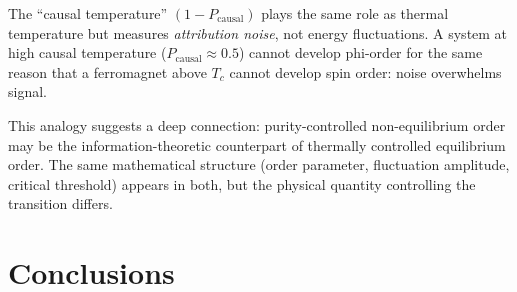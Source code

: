 \documentclass[11pt,a4paper]{article}
\begin{document}
The ``causal temperature'' $(1-P_\mathrm{causal})$ plays the same role as thermal
temperature but measures \emph{attribution noise}, not energy fluctuations.
A system at high causal temperature ($P_\mathrm{causal} \approx 0.5$) cannot
develop phi-order for the same reason that a ferromagnet above $T_c$ cannot
develop spin order: noise overwhelms signal.

This analogy suggests a deep connection:
purity-controlled non-equilibrium order may be the information-theoretic
counterpart of thermally controlled equilibrium order.
The same mathematical structure (order parameter, fluctuation amplitude,
critical threshold) appears in both, but the physical quantity controlling
the transition differs.

\section{Conclusions}
\end{document}

